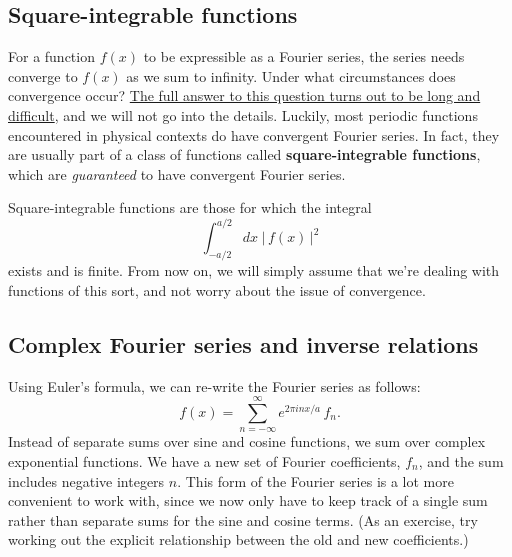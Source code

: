 \documentclass[10pt,a4paper]{article}
\begin{document}
\subsection{Square-integrable functions}
\label{square-integrable}

For a function $f(x)$ to be expressible as a Fourier series, the
series needs converge to $f(x)$ as we sum to infinity. Under what
circumstances does convergence occur?
\href{http://en.wikipedia.org/wiki/Convergence_of_Fourier_series}{The
full answer to this question turns out to be long and difficult}, and we
will not go into the details. Luckily, most periodic functions
encountered in physical contexts do have convergent Fourier series. In
fact, they are usually part of a class of functions called
\textbf{square-integrable functions}, which are \emph{guaranteed} to
have convergent Fourier series.

Square-integrable functions are those for which the integral
\begin{equation}
  \int_{-a/2}^{a/2} dx\; \big|\,f(x)\,\big|^2
\end{equation}
exists and is finite. From now on, we will simply assume that we're
dealing with functions of this sort, and not worry about the issue of
convergence.

\subsection{Complex Fourier series and inverse relations}
\label{complex-fourier-series}

Using Euler's formula, we can re-write the Fourier series as follows:
\begin{equation}
  f(x) = \sum_{n=-\infty}^\infty e^{2\pi i n x/a}\, f_n.
\end{equation}
Instead of separate sums over sine and cosine functions, we sum over
complex exponential functions. We have a new set of Fourier
coefficients, $f_n$, and the sum includes negative integers $n$.  This
form of the Fourier series is a lot more convenient to work with,
since we now only have to keep track of a single sum rather than
separate sums for the sine and cosine terms.  (As an exercise, try
working out the explicit relationship between the old and new
coefficients.)
\end{document}
